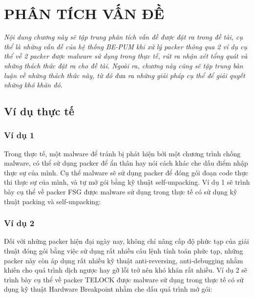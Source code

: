 
\newpage
\chapter{PHÂN TÍCH VẤN ĐỀ}

\begin{concept}[15cm]
\textit{Nội dung chương này sẽ tập trung phân tích vấn đề được đặt ra trong đề tài, cụ thể là những vấn đề của hệ thống BE-PUM khi xử lý packer thông qua 2 ví dụ cụ thể về 2 packer được malware sử dụng trong thực tế, rút ra nhận xét tổng quát và những thách thức đặt ra cho đề tài. Ngoài ra, chương này cũng sẽ tập trung bàn luận về những thách thức này, từ đó đưa ra những giải pháp cụ thể để giải quyết những khó khăn đó.}
\end{concept}

\section{Ví dụ thực tế}

\subsection{Ví dụ 1}

\hspace{0.5cm}Trong thực tế, một malware để tránh bị phát hiện bởi một chương trình chống malware, có thể sử dụng packer để ẩn thân hay nói cách khác che dấu điểm nhập thực sự của mình. Cụ thể malware sẽ sử dụng packer để đóng gói đoạn code thực thi thực sự của mình, và tự mở gói bằng kỹ thuật self-unpacking. Ví dụ 1 sẽ trình bày cụ thể về packer FSG được malware sử dụng trong thực tế có sử dụng kỹ thuật packing và self-unpacking:


\subsection{Ví dụ 2}

\hspace{0.5cm}Đối với những packer hiện đại ngày nay, không chỉ nâng cấp độ phức tạp của giải thuật đóng gói bằng việc sử dụng rất nhiều câu lệnh tính toán phức tạp, những packer này còn áp dụng rất nhiều kỹ thuật anti-reversing, anti-debugging nhằm khiến cho quá trình dịch ngược hay gỡ lỗi trở nên khó khăn rất nhiều. Ví dụ 2 sẽ trình bày cụ thể về packer TELOCK được malware sử dụng trong thực tế có sử dụng kỹ thuật Hardware Breakpoint nhằm che dấu quá trình mở gói:

